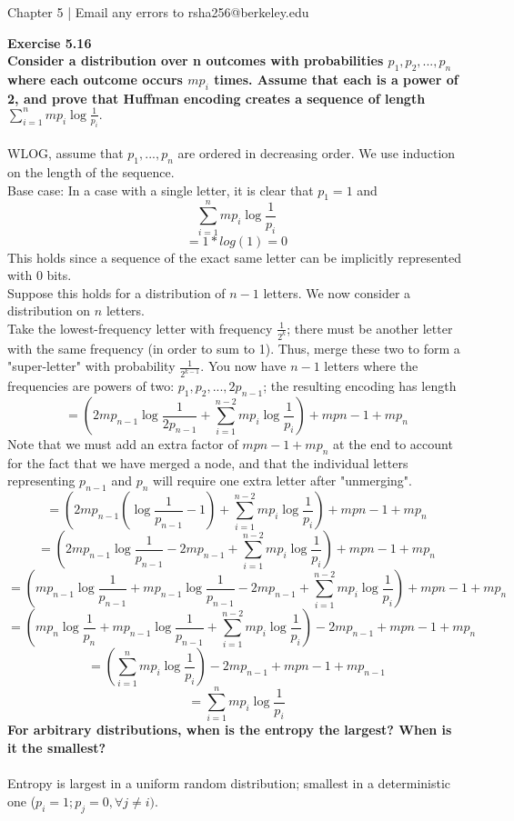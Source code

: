 \documentclass{article}
\newenvironment{problem}[2][Exercise]
    { \begin{mdframed}[backgroundcolor=gray!20] \textbf{#1 #2} \\}
    {  \end{mdframed}}
\begin{document}
\begin{mdframed}[backgroundcolor=blue!20]
Chapter 5 | Email any errors to rsha256@berkeley.edu
\end{mdframed}
 
\begin{problem}{5.16}
\textbf{Consider a distribution over n outcomes with probabilities $p_1, p_2, ..., p_n$ where each outcome occurs $mp_i$ times. Assume that each is a power of 2, and prove that Huffman encoding creates a sequence of length $\sum_{i=1}^{n}mp_i \log \frac{1}{p_i}.$}
\\
\\
WLOG, assume that $p_1, ..., p_n$ are ordered in decreasing order. We use induction on the length of the sequence.
\\
Base case: In a case with a single letter, it is clear that $p_1 = 1$ and 
\[
    \sum_{i=1}^{n}mp_i \log \frac{1}{p_i}
\]
\[
    = 1 * log(1) = 0
\]
This holds since a sequence of the exact same letter can be implicitly represented with 0 bits.
\\
Suppose this holds for a distribution of $n - 1$ letters. We now consider a distribution on $n$ letters.
\\
Take the lowest-frequency letter with frequency $\frac{1}{2^{k}}$; there must be another letter with the same frequency (in order to sum to 1). Thus, merge these two to form a "super-letter" with probability $\frac{1}{2^{k - 1}}$. You now have $n - 1$ letters where the frequencies are powers of two: $p_1, p_2, ..., 2p_{n - 1}$; the resulting encoding has length 
\[
    = (2mp_{n - 1} \log \frac{1}{2p_{n - 1}} + \sum_{i=1}^{n - 2}mp_i \log \frac{1}{p_i}) + mp{n - 1} + mp_{n}
\]
Note that we must add an extra factor of $mp{n - 1} + mp_{n}$ at the end to account for the fact that we have merged a node, and that the individual letters representing $p_{n - 1}$ and $p_n$ will require one extra letter after "unmerging".
\[
    = (2mp_{n - 1} (\log \frac{1}{p_{n - 1}} - 1) + \sum_{i=1}^{n - 2}mp_i \log \frac{1}{p_i}) + mp{n - 1} + mp_{n}
\]
\[
    = (2mp_{n - 1} \log \frac{1}{p_{n - 1}} - 2mp_{n - 1} + \sum_{i=1}^{n - 2}mp_i \log \frac{1}{p_i}) + mp{n - 1} + mp_{n}
\]
\[
    = (mp_{n - 1} \log \frac{1}{p_{n - 1}} + mp_{n - 1} \log \frac{1}{p_{n - 1}} - 2mp_{n - 1} + \sum_{i=1}^{n - 2}mp_i \log \frac{1}{p_i}) + mp{n - 1} + mp_{n}
\]
\[
    = (mp_n \log \frac{1}{p_n} + mp_{n - 1} \log \frac{1}{p_{n - 1}} + \sum_{i=1}^{n - 2}mp_i \log \frac{1}{p_i}) - 2mp_{n - 1} + mp{n - 1} + mp_{n}
\]
\[
    = (\sum_{i=1}^{n}mp_i \log \frac{1}{p_i}) - 2mp_{n - 1} + mp{n - 1} + mp_{n - 1}
\]
\[
    = \sum_{i=1}^{n}mp_i \log \frac{1}{p_i}
\]
\textbf{For arbitrary distributions, when is the entropy the largest? When is it the smallest?}
\\
\\
Entropy is largest in a uniform random distribution; smallest in a deterministic one ($p_i = 1; p_j = 0, \forall j \neq i)$.
\end{problem}
\end{document}
